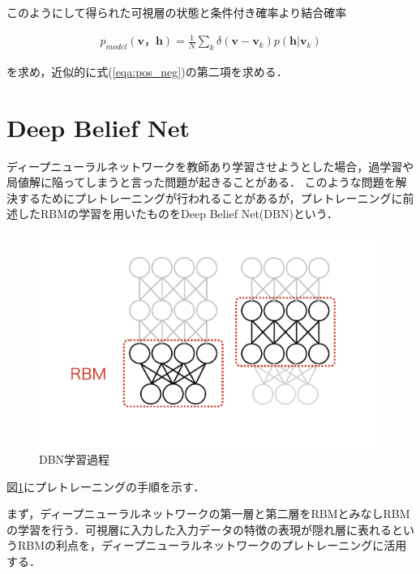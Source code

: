 このようにして得られた可視層の状態と条件付き確率より結合確率

\begin{eqnarray}
	p_{model}(\bm{v}，\bm{h})=\frac{1}{N} \sum_k \delta( \bm{v} - \bm{v}_k ) p(\bm{h}|\bm{v}_k)
\end{eqnarray}

を求め，近似的に式(\ref{eqa:pos_neg})の第二項を求める．

\section{Deep Belief Net}

ディープニューラルネットワークを教師あり学習させようとした場合，過学習や局値解に陥ってしまうと言った問題が起きることがある．
このような問題を解決するためにプレトレーニングが行われることがあるが，プレトレーニングに前述したRBMの学習を用いたものをDeep Belief Net(DBN)\cite{DBN}という．

\begin{figure}[tb]
 \begin{center}
  \includegraphics[scale=0.55]{./koki/dbn.png}
  \hspace*{0cm}
  \vspace*{0cm} 
  \caption{DBN学習過程}
  \label{fig:dbn}
 \end{center}
\end{figure}

図\ref{fig:dbn}にプレトレーニング\cite{glw-training}の手順を示す．

まず，ディープニューラルネットワークの第一層と第二層をRBMとみなしRBMの学習を行う．可視層に入力した入力データの特徴の表現が隠れ層に表れるというRBMの利点を，ディープニューラルネットワークのプレトレーニングに活用する．

